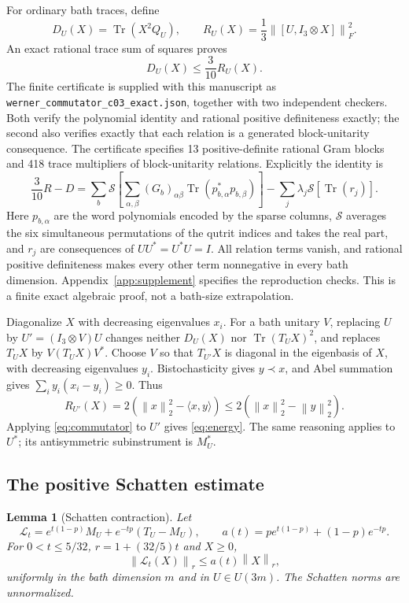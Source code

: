 \documentclass[11pt]{article}
\newtheorem{lemma}{Lemma}[section]
\theoremstyle{definition}
\theoremstyle{remark}
\DeclareMathOperator{\Tr}{Tr}
\newcommand{\norm}[1]{\left\lVert#1\right\rVert}
\begin{document}
For ordinary bath traces, define
\[
 D_U(X)=\Tr(X^2Q_U),\qquad
 R_U(X)=\frac13\norm{[U,I_3\otimes X]}_F^2.
\]
An exact rational trace sum of squares proves
\begin{equation}\label{eq:commutator}
 D_U(X)\le\frac3{10}R_U(X).
\end{equation}
The finite certificate is supplied with this manuscript as \texttt{werner\_commutator\_c03\_exact.json}, together with two independent checkers. Both verify the polynomial identity and rational positive definiteness exactly; the second also verifies exactly that each relation is a generated block-unitarity consequence. The certificate specifies 13 positive-definite rational Gram blocks and 418 trace multipliers of block-unitarity relations. Explicitly the identity is
\[
 \frac3{10}R-D=
 \sum_b\mathcal S\!\left[\sum_{\alpha,\beta}(G_b)_{\alpha\beta}
          \Tr(p_{b,\alpha}^*p_{b,\beta})\right]
 -\sum_j\lambda_j\mathcal S[\Tr(r_j)].
\]
Here $p_{b,\alpha}$ are the word polynomials encoded by the sparse columns, $\mathcal S$ averages the six simultaneous permutations of the qutrit indices and takes the real part, and $r_j$ are consequences of $UU^*=U^*U=I$. All relation terms vanish, and rational positive definiteness makes every other term nonnegative in every bath dimension. Appendix~\ref{app:supplement} specifies the reproduction checks. This is a finite exact algebraic proof, not a bath-size extrapolation.

Diagonalize $X$ with decreasing eigenvalues $x_i$. For a bath unitary $V$, replacing $U$ by $U'=(I_3\otimes V)U$ changes neither $D_U(X)$ nor $\Tr(T_UX)^2$, and replaces $T_UX$ by $V(T_UX)V^*$. Choose $V$ so that $T_{U'}X$ is diagonal in the eigenbasis of $X$, with decreasing eigenvalues $y_i$. Bistochasticity gives $y\prec x$, and Abel summation gives $\sum_i y_i(x_i-y_i)\ge0$. Thus
\[
 R_{U'}(X)=2(\norm x_2^2-\langle x,y\rangle)
 \le2(\norm x_2^2-\norm y_2^2).
\]
Applying \eqref{eq:commutator} to $U'$ gives \eqref{eq:energy}. The same reasoning applies to $U^*$; its antisymmetric subinstrument is $M_U^*$.

\subsection{The positive Schatten estimate}

\begin{lemma}[Schatten contraction]\label{lem:schatten}
Let
\[
 \mathcal L_t=e^{t(1-p)}M_U+e^{-tp}(T_U-M_U),\qquad
 a(t)=pe^{t(1-p)}+(1-p)e^{-tp}.
\]
For $0<t\le5/32$, $r=1+(32/5)t$ and $X\ge0$,
\begin{equation}\label{eq:schatten}
 \norm{\mathcal L_t(X)}_r\le a(t)\norm X_r,
\end{equation}
uniformly in the bath dimension $m$ and in $U\in U(3m)$. The Schatten norms are unnormalized.
\end{lemma}
\end{document}
